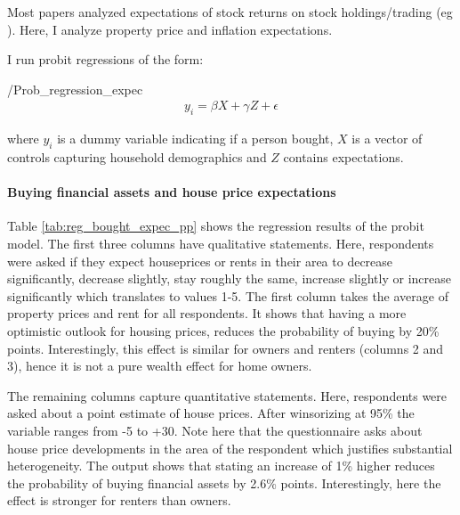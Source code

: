 \documentclass[ProjectABM]{subfiles}
\begin{document}
Most papers analyzed expectations of stock returns on stock holdings/trading (eg \cite{dominitz_manski_2011measuring_expectations, giglio_et_al_2019five}). Here, I analyze property price and inflation expectations.%

I run probit regressions of the form:
\begin{verbatimwrite}{\EqDir/Prob_regression_expec}
	\begin{align}
		y_i = \beta X + \gamma Z + \epsilon  \label{eq:Prob_reg_expec}
	\end{align}
\end{verbatimwrite}


where $y_i$ is a dummy variable indicating if a person bought, $X$ is a vector of controls capturing household demographics and $Z$ contains expectations.


\paragraph{Buying financial assets and house price expectations}
Table \ref{tab:reg_bought_expec_pp} shows the regression results of the probit model. The first three columns have qualitative statements. Here, respondents were asked if they expect houseprices or rents in their area to decrease significantly, decrease slightly, stay roughly the same, increase slightly or increase significantly which translates to values 1-5. The first column takes the average of property prices and rent for all respondents. It shows that having a more optimistic outlook for housing prices, reduces the probability of buying by 20\% points. Interestingly, this effect is similar for owners and renters (columns 2 and 3), hence it is not a pure wealth effect for home owners.%

The remaining columns capture quantitative statements. Here, respondents were asked about a point estimate of house prices. After winsorizing at 95\% the variable ranges from -5 to +30. Note here that the questionnaire asks about house price developments in the area of the respondent which justifies substantial heterogeneity. The output shows that stating an increase of 1\% higher reduces the probability of buying financial assets by 2.6\% points. Interestingly, here the effect is stronger for renters than owners.
\end{document}
